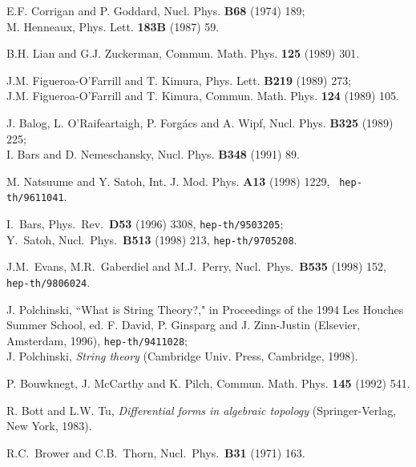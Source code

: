 \documentclass[a4paper,12pt]{article}
\begin{document}
\begin{thebibliography}{999}
E.F. Corrigan and P. Goddard, Nucl. Phys. {\bf B68} (1974) 189;\\
M. Henneaux, Phys. Lett. {\bf 183B} (1987) 59.

B.H. Lian and G.J. Zuckerman, Commun. Math. Phys. {\bf 125} (1989) 301.

J.M. Figueroa-O'Farrill and T. Kimura, Phys. Lett. {\bf B219} (1989) 273;\\
J.M. Figueroa-O'Farrill and T. Kimura, Commun. Math. Phys. {\bf 124} (1989)
105.


J. Balog, L. O'Raifeartaigh, P. Forg\'{a}cs and A. Wipf, Nucl. Phys. {\bf
B325} (1989) 225;\\
I. Bars and D. Nemeschansky, Nucl. Phys. {\bf B348} (1991) 89.

M. Natsuume and Y. Satoh, Int. J. Mod. Phys. {\bf A13} (1998) 1229, {\tt
hep-th/9611041}.

I.~Bars,
Phys.\ Rev.\ {\bf D53} (1996) 3308,
{\tt hep-th/9503205};\\
Y.~Satoh,
Nucl.\ Phys.\ {\bf B513} (1998) 213,
{\tt hep-th/9705208}.

J.M.~Evans, M.R.~Gaberdiel and M.J.~Perry,
Nucl.\ Phys.\ {\bf B535} (1998) 152,
{\tt hep-th/9806024}.

J. Polchinski, ``What is String Theory?,"
in Proceedings of the 1994 Les Houches Summer School,
ed. F. David, P. Ginsparg and J. Zinn-Justin (Elsevier, Amsterdam, 1996),
{\tt hep-th/9411028}; \\
J. Polchinski, {\it String theory} (Cambridge Univ. Press, Cambridge, 1998).

P. Bouwknegt, J. McCarthy and K. Pilch, Commun. Math. Phys. {\bf 145} (1992)
541.

R. Bott and  L.W. Tu, {\it Differential forms in algebraic topology}
(Springer-Verlag, New York, 1983).

R.C.~Brower and C.B.~Thorn,
Nucl.\ Phys.\ {\bf B31} (1971) 163.


\end{thebibliography}
\end{document}
